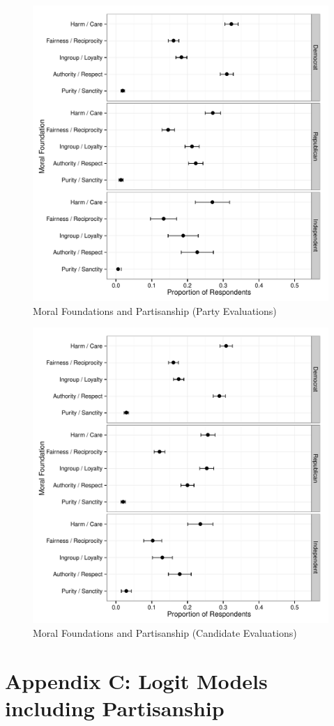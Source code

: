 \documentclass[12pt]{paper}
\begin{document}
\begin{figure}[ht]\centering
\includegraphics[scale=.55]{../calc/fig/a2_mft_pid_pa.pdf}
\caption{Moral Foundations and Partisanship (Party Evaluations)}\label{fig:mft_pid_pa}
\end{figure}

\begin{figure}[ht]\centering
\includegraphics[scale=.55]{../calc/fig/a3_mft_pid_ca.pdf}
\caption{Moral Foundations and Partisanship (Candidate Evaluations)}\label{fig:mft_pid_ca}
\end{figure}


\clearpage
\section*{Appendix C: Logit Models including Partisanship}



\clearpage


\end{document}
